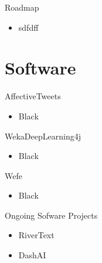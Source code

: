 \documentclass[handout]{beamer}
\begin{document}
\begin{frame}{Roadmap}
\begin{scriptsize}
\begin{itemize}
\item sdfdff
\end{itemize}
\end{scriptsize}
\end{frame}



\section{Software}


\begin{frame}{AffectiveTweets}
\begin{scriptsize}

\begin{itemize}
\item Black
\end{itemize}


\end{scriptsize}
\end{frame}


\begin{frame}{WekaDeepLearning4j}
\begin{scriptsize}

\begin{itemize}
\item Black
\end{itemize}


\end{scriptsize}
\end{frame}


\begin{frame}{Wefe}
\begin{scriptsize}

\begin{itemize}
\item Black
\end{itemize}


\end{scriptsize}
\end{frame}


\begin{frame}{Ongoing Sofware Projects}
\begin{scriptsize}

\begin{itemize}
\item RiverText
\item DashAI
\end{itemize}


\end{scriptsize}
\end{frame}
\end{document}
